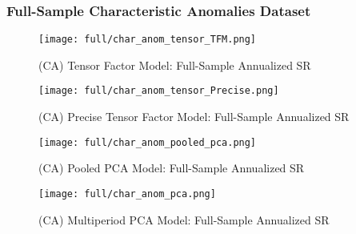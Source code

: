 \subsubsection{Full-Sample Characteristic Anomalies Dataset}

\begin{figure}[H]
    \centering
    \texttt{[image: full/char\_anom\_tensor\_TFM.png]}
    \caption{(CA) Tensor Factor Model: Full-Sample Annualized SR}
    \label{fig:char_anom-primary-tfm}
\end{figure}

\begin{figure}[H]
    \centering
    \texttt{[image: full/char\_anom\_tensor\_Precise.png]}
    \caption{(CA) Precise Tensor Factor Model: Full-Sample Annualized SR}
    \label{fig:char_anom-primary-precise}
\end{figure}

\begin{figure}[H]
    \centering
    \texttt{[image: full/char\_anom\_pooled\_pca.png]}
    \caption{(CA) Pooled PCA Model: Full-Sample Annualized SR}
    \label{fig:char_anom-primary-pooled-pca}
\end{figure}

\begin{figure}[H]
    \centering
    \texttt{[image: full/char\_anom\_pca.png]}
    \caption{(CA) Multiperiod PCA Model: Full-Sample Annualized SR}
    \label{fig:char_anom-primary-pca}
\end{figure}
